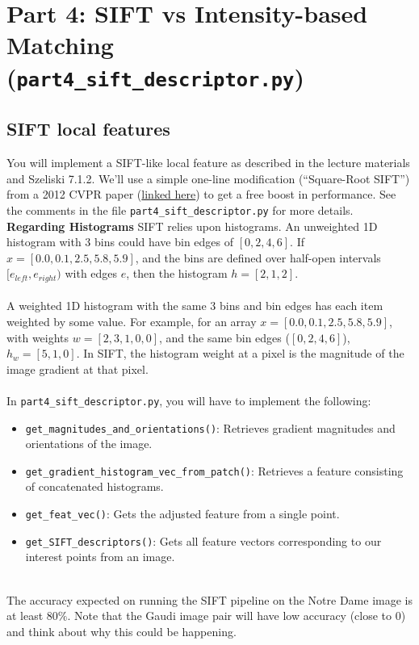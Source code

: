 \documentclass{article}
\begin{document}
\section{Part 4: SIFT vs Intensity-based Matching (\lstinline{part4_sift_descriptor.py})}

\subsection{SIFT local features}
You will implement a SIFT-like local feature as described in the lecture materials and Szeliski 7.1.2. We'll use a simple one-line modification (``Square-Root SIFT'') from a 2012 CVPR paper (\href{https://www.robots.ox.ac.uk/~vgg/publications/2012/Arandjelovic12/arandjelovic12.pdf}{linked here}) to get a free boost in performance. See the comments in the file \lstinline{part4_sift_descriptor.py} for more details.  \\ 

\noindent \textbf{Regarding Histograms}
SIFT relies upon histograms. An unweighted 1D histogram with 3 bins could have bin edges of $[0,2,4,6]$. If $x=[0.0, 0.1, 2.5, 5.8, 5.9]$, and the bins are defined over half-open intervals $[e_{left}, e_{right})$ with edges $e$, then the histogram $h = [2,1,2]$.
\\
\\
A weighted 1D histogram with the same 3 bins and bin edges has each item weighted by some value. For example, for an array $x=[0.0, 0.1, 2.5, 5.8, 5.9]$, with weights $w=[ 2, 3, 1, 0, 0]$, and the same bin edges ($[0,2,4,6]$), $h_w = [5, 1, 0]$. In SIFT, the histogram weight at a pixel is the magnitude of the image gradient at that pixel.
\\
\\
In \lstinline{part4_sift_descriptor.py}, you will have to implement the following:
\begin{itemize}
    \item \lstinline{get_magnitudes_and_orientations()}: Retrieves gradient magnitudes and orientations of the image.
    \item \lstinline{get_gradient_histogram_vec_from_patch()}: Retrieves a feature consisting of concatenated histograms.
    \item \lstinline{get_feat_vec()}: Gets the adjusted feature from a single point.
    \item \lstinline{get_SIFT_descriptors()}: Gets all feature vectors corresponding to our interest points from an image.
\end{itemize}
\\
The accuracy expected on running the SIFT pipeline on the Notre Dame image is at least 80$\%$. Note that the Gaudi image pair will have low accuracy (close to 0) and think about why this could be happening.
\end{document}
